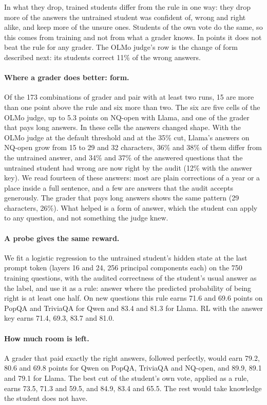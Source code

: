 In what they drop, trained students differ from the rule in one way: they drop more of the answers the untrained student was confident of, wrong and right alike, and keep more of the unsure ones. Students of the own vote do the same, so this comes from training and not from what a grader knows. In points it does not beat the rule for any grader. The OLMo judge's row is the change of form described next: its students correct 11\% of the wrong answers.

\paragraph{Where a grader does better: form.} Of the 173 combinations of grader and pair with at least two runs, 15 are more than one point above the rule and six more than two. The six are five cells of the OLMo judge, up to 5.3 points on NQ-open with Llama, and one of the grader that pays long answers. In these cells the answers changed shape. With the OLMo judge at the default threshold and at the 35\% cut, Llama's answers on NQ-open grow from 15 to 29 and 32 characters, 36\% and 38\% of them differ from the untrained answer, and 34\% and 37\% of the answered questions that the untrained student had wrong are now right by the audit (12\% with the answer key). We read fourteen of these answers: most are plain corrections of a year or a place inside a full sentence, and a few are answers that the audit accepts generously. The grader that pays long answers shows the same pattern (29 characters, 26\%). What helped is a form of answer, which the student can apply to any question, and not something the judge knew.

\paragraph{A probe gives the same reward.} We fit a logistic regression to the untrained student's hidden state at the last prompt token (layers 16 and 24, 256 principal components each) on the 750 training questions, with the audited correctness of the student's usual answer as the label, and use it as a rule: answer where the predicted probability of being right is at least one half. On new questions this rule earns 71.6 and 69.6 points on PopQA and TriviaQA for Qwen and 83.4 and 81.3 for Llama. RL with the answer key earns 71.4, 69.3, 83.7 and 81.0.

\paragraph{How much room is left.} A grader that paid exactly the right answers, followed perfectly, would earn 79.2, 80.6 and 69.8 points for Qwen on PopQA, TriviaQA and NQ-open, and 89.9, 89.1 and 79.1 for Llama. The best cut of the student's own vote, applied as a rule, earns 73.5, 71.3 and 59.5, and 84.9, 83.4 and 65.5. The rest would take knowledge the student does not have.

